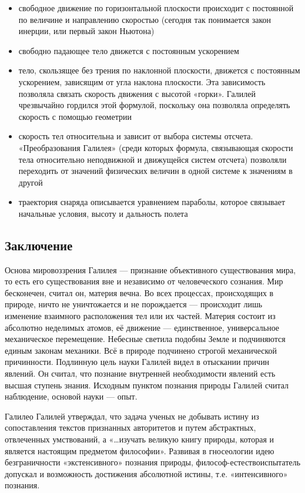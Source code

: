 \documentclass[
]{article}
\providecommand{\tightlist}{%
  \setlength{\itemsep}{0pt}\setlength{\parskip}{0pt}}
\begin{document}
\begin{itemize}
\tightlist
\item
  свободное движение по горизонтальной плоскости происходит с постоянной
  по величине и направлению скоростью (сегодня так понимается закон
  инерции, или первый закон Ньютона)
\item
  свободно падающее тело движется с постоянным ускорением
\item
  тело, скользящее без трения по наклонной плоскости, движется с
  постоянным ускорением, зависящим от угла наклона плоскости. Эта
  зависимость позволяла связать скорость движения с высотой «горки».
  Галилей чрезвычайно гордился этой формулой, поскольку она позволяла
  определять скорость с помощью геометрии
\item
  скорость тел относительна и зависит от выбора системы отсчета.
  «Преобразования Галилея» (среди которых формула, связывающая скорости
  тела относительно неподвижной и движущейся систем отсчета) позволяли
  переходить от значений физических величин в одной системе к значениям
  в другой
\item
  траектория снаряда описывается уравнением параболы, которое связывает
  начальные условия, высоту и дальность полета
\end{itemize}

\hypertarget{ux437ux430ux43aux43bux44eux447ux435ux43dux438ux435-5}{%
\subsection{Заключение}\label{ux437ux430ux43aux43bux44eux447ux435ux43dux438ux435-5}}

Основа мировоззрения Галилея --- признание объективного существования
мира, то есть его существования вне и независимо от человеческого
сознания. Мир бесконечен, считал он, материя вечна. Во всех процессах,
происходящих в природе, ничто не уничтожается и не порождается ---
происходит лишь изменение взаимного расположения тел или их частей.
Материя состоит из абсолютно неделимых атомов, её движение ---
единственное, универсальное механическое перемещение. Небесные светила
подобны Земле и подчиняются единым законам механики. Всё в природе
подчинено строгой механической причинности. Подлинную цель науки Галилей
видел в отыскании причин явлений. Он считал, что познание внутренней
необходимости явлений есть высшая ступень знания. Исходным пунктом
познания природы Галилей считал наблюдение, основой науки --- опыт.

Галилео Галилей утверждал, что задача ученых не добывать истину из
сопоставления текстов признанных авторитетов и путем абстрактных,
отвлеченных умствований, а «\ldots изучать великую книгу природы,
которая и является настоящим предметом философии». Развивая в
гносеологии идею безграничности «экстенсивного» познания природы,
философ-естествоиспытатель допускал и возможность достижения абсолютной
истины, т.е. «интенсивного» познания.
\end{document}
